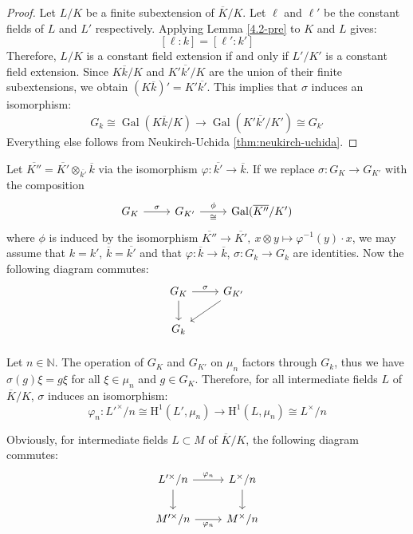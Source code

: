 \begin{proof}
Let $L/K$ be a finite subextension of $\overline{K}/K$. Let $\ell$ and $\ell'$ be the constant fields of $L$ and $L'$ respectively. Applying Lemma \ref{4.2-pre} to $K$ and $L$ gives:
\[ [\ell:k] = [\ell':k'] \]
Therefore, $L/K$ is a constant field extension if and only if $L'/K'$ is a constant field extension. Since $K\overline{k}/K$ and $K'\overline{k'}/K$ are the union of their finite subextensions, we obtain $(K\overline{k})' = K'\overline{k'}$. This implies that $\sigma$ induces an isomorphism:
\[G_k \cong \operatorname{Gal}(K\overline{k}/K) \to \operatorname{Gal}(K'\overline{k'}/K')\cong G_{k'}\] 
Everything else follows from Neukirch-Uchida \ref{thm:neukirch-uchida}.
\end{proof}

\begin{remark}
Let $\overline{K''} = \overline{K'}\otimes_{\overline{k'}}\overline{k}$ via the isomorphism $\varphi: \overline{k'}\to \overline{k}$. If we replace $\sigma: G_K\to G_{K'}$ with the composition
\[ \begin{tikzcd}
G_K \ar[r, "\sigma"] & G_{K'} \ar[r, "\phi", "\cong"'] & \operatorname{Gal}(\overline{K''}/K')
\end{tikzcd} \]
where $\phi$ is induced by the isomorphism $\overline{K''}\to\overline{K'},\ x\otimes y\mapsto \varphi^{-1}(y)\cdot x$, we may assume that $k=k'$, $\overline{k} = \overline{k'}$ and that $\varphi:\overline{k}\to\overline{k}$, $\sigma: G_k\to G_k$ are identities. Now the following diagram commutes:
\[ \begin{tikzcd}
G_K \ar[d]\ar[r, "\sigma"] & G_{K'} \ar[ld]\\
G_{k} &
\end{tikzcd} \]
\end{remark}

\paragraph{} Let $n\in\mathbb{N}$. The operation of $G_K$ and $G_{K'}$ on $\mu_n$ factors through $G_k$, thus we have $\sigma(g)\xi = g\xi$ for all $\xi\in\mu_n$ and $g\in G_K$. Therefore, for all intermediate fields $L$ of $\overline{K}/K$, $\sigma$ induces an isomorphism:
\[ \varphi_n:L'^\times/n \cong\mathrm{H}^1(L', \mu_n) \to \mathrm{H}^1(L,\mu_n) \cong L^\times/n \]

\begin{remark}\label{remark-localphi-extension}
Obviously, for intermediate fields $L\subset M$ of $\overline{K}/K$, the following diagram commutes:
\[ \begin{tikzcd}
L'^\times/n \ar[r, "\varphi_n"]\dar & L^\times/n \dar\\
M'^\times/n \ar[r, "\varphi_n"'] & M^\times/n
\end{tikzcd} \]
\end{remark}

